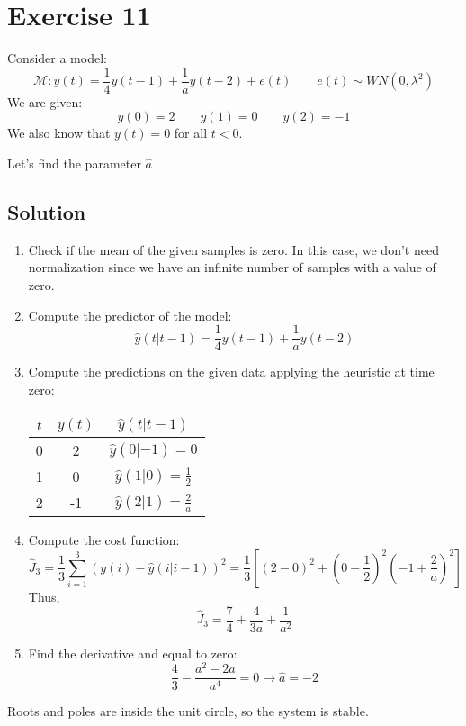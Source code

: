 \section{Exercise 11}

Consider a model: 
\[\mathcal{M}:y(t)=\dfrac{1}{4}y(t-1)+\dfrac{1}{a}y(t-2)+e(t)\qquad e(t)\sim WN(0,\lambda^2)\]
We are given:
\[y(0)=2 \qquad y(1)=0 \qquad y(2)=-1\]
We also know that $y(t)=0$ for all $t < 0$. 

Let's find the parameter $\hat{a}$

\subsection*{Solution}
\begin{enumerate}
    \item Check if the mean of the given samples is zero.
        In this case, we don't need normalization since we have an infinite number of samples with a value of zero.
    \item Compute the predictor of the model:
        \[\hat{y}(t|t-1)=\dfrac{1}{4}y(t-1)+\dfrac{1}{a}y(t-2)\]
    \item Compute the predictions on the given data applying the heuristic at time zero:
        \begin{table}[H]
            \centering
            \begin{tabular}{ccc}
            \hline
            $t$ & $y(t)$ & $\hat{y}(t|t-1)$                 \\ \hline
            0   & 2      & $\hat{y}(0|-1)=0$                \\
            1   & 0      & $\hat{y}(1|0)=\frac{1}{2}$       \\
            2   & -1      & $\hat{y}(2|1)=\frac{2}{a}$      \\ \hline
            \end{tabular}
        \end{table}
    \item Compute the cost function:
        \[\hat{J}_3=\dfrac{1}{3}\sum_{i=1}^{3}{\left(y(i)-\hat{y}(i|i-1)\right)}^2=\dfrac{1}{3}\left[{\left(2-0\right)}^2+{\left(0-\dfrac{1}{2}\right)}^2{\left(-1+\dfrac{2}{a}\right)}^2\right]\]
        Thus, 
        \[\hat{J}_3=\dfrac{7}{4}+\dfrac{4}{3a}+\dfrac{1}{a^2}\]
    \item Find the derivative and equal to zero: 
        \[\dfrac{4}{3}-\dfrac{a^2-2a}{a^4}=0\rightarrow \hat{a}=-2\]
\end{enumerate}
Roots and poles are inside the unit circle, so the system is stable.